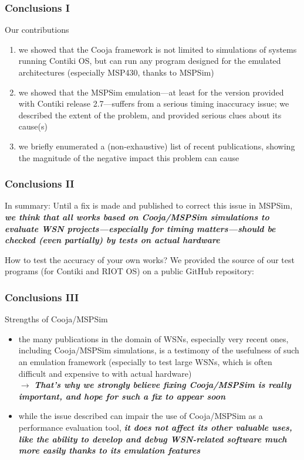 \documentclass[10pt,c]{beamer}
\renewcommand{\emph}[1]{\textbf{\textit{#1}}}
\begin{document}
\begin{frame}
\frametitle{Conclusions I}
\begin{block}{Our contributions}
\begin{enumerate}
\item we showed that the Cooja framework is not limited to simulations
of systems running Contiki OS, but can run any program designed for the
emulated architectures (especially MSP430, thanks to MSPSim)
\item we showed that the MSPSim emulation---at least for the version
provided with Contiki release 2.7---suffers from a serious timing inaccuracy
issue; we described the extent of the problem, and provided serious clues
about its cause(s)
\item we briefly enumerated a (non-exhaustive) list of recent publications,
showing the magnitude of the negative impact this problem can cause
\end{enumerate}
\end{block}
\end{frame}

\begin{frame}
\frametitle{Conclusions II}
\begin{alertblock}{In summary:}
Until a fix is made and published to correct this issue in MSPSim,
\emph{we think that all works based on Cooja/MSPSim simulations to evaluate
WSN projects---especially for timing matters---should be checked (even
partially) by tests on actual hardware}
\end{alertblock}
\begin{exampleblock}{How to test the accuracy of your own works?}
We provided the source of our test programs (for Contiki and RIOT OS)
on a public GitHub repository:
\end{exampleblock}
\end{frame}

\begin{frame}
\frametitle{Conclusions III}
\begin{exampleblock}{Strengths of Cooja/MSPSim}
\begin{itemize}
\item the many publications in the domain of WSNs, especially very recent
ones, including Cooja/MSPSim simulations, is a testimony of the usefulness
of such an emulation framework (especially to test large WSNs, which is
often difficult and expensive to with actual hardware) \\
$\rightarrow$ \emph{That's why we strongly believe fixing Cooja/MSPSim
is really important, and hope for such a fix to appear soon}
\item while the issue described can impair the use of Cooja/MSPSim as
a performance evaluation tool, \emph{it does not affect its other
valuable uses, like the ability to develop and debug WSN-related
software much more easily thanks to its emulation features}
\end{itemize}
\end{exampleblock}
\end{frame}
\end{document}
